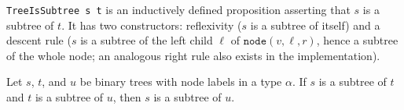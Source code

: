 \begin{definition}
\label{CommunicationComplexity.TreeIsSubtree}
\leanok
\texttt{TreeIsSubtree s t} is an inductively defined proposition asserting that $s$ is a
subtree of $t$.  It has two constructors: reflexivity ($s$ is a subtree of itself) and a
descent rule ($s$ is a subtree of the left child $\ell$ of $\texttt{node}(v,\ell,r)$,
hence a subtree of the whole node; an analogous right rule also exists in the
implementation).
\end{definition}

\begin{lemma}
\label{CommunicationComplexity.TreeIsSubtree.trans}
\leanok
{}
Let $s$, $t$, and $u$ be binary trees with node labels in a type $\alpha$. If $s$ is a
subtree of $t$ and $t$ is a subtree of $u$, then $s$ is a subtree of $u$.
\end{lemma}

